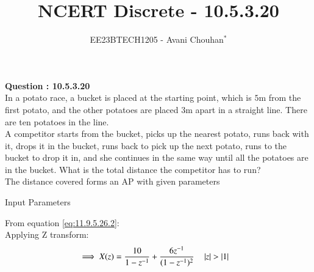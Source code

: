 \documentclass[journal,12pt,twocolumn]{IEEEtran}
\theoremstyle{remark}
\begin{document}

\vspace{3cm}

\title{NCERT Discrete - 10.5.3.20}
\author{EE23BTECH1205 - Avani Chouhan$^{*}$%
}
\maketitle
\newpage
\bigskip

\renewcommand{\thefigure}{\theenumi}
\renewcommand{\thetable}{\theenumi}

\vspace{3cm}
\textbf{Question : 10.5.3.20} \\
In a potato race, a bucket is placed at the starting point, which is $5$m from the first potato, and the other potatoes are placed $3$m apart in a straight line. There are ten potatoes in the line.\\
A competitor starts from the bucket, picks up the nearest potato, runs back with it, drops it in the bucket, runs back to pick up the next potato, runs to the bucket to drop it in, and she continues in the same way until all the potatoes are in the bucket. What is the total distance the competitor has to run?\\

\solution
The distance covered forms an AP with given parameters \\
\begin{table}[H]
 \centering
  
  \caption{Input Parameters}
 \end{table}
 From equation \eqref{eq:11.9.5.26.2}: \\
Applying Z transform:
\begin{align}
   \implies X(z) &=\frac{10}{1-z^{-1}} + \frac{6z^{-1}}{(1-z^{-1})^2} 
    \quad \left\vert z\right\vert>\left\vert1\right\vert
\end{align}
\end{document}
